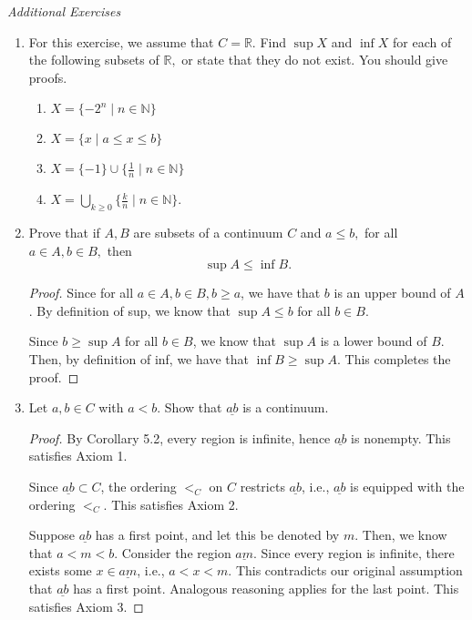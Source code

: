 \documentclass[11pt]{article}
\newcommand{\bbN}{\mathbb{N}}
\newcommand{\bbR}{\mathbb{R}}
\renewcommand{\_}[1]{\underline{ #1 }}
\theoremstyle{definition}
\numberwithin{equation}{subsection}
\begin{document}
\begin{center}
{\em Additional Exercises}
\end{center}

\begin{enumerate}
\item
For this exercise, we assume that $C=\bbR.$ Find $\sup X$ and $\inf X$ for each of the following subsets
of $\bbR,$ or state that they do not exist. You should give proofs.
\begin{enumerate}
\item $X=\{-2^n\mid n\in \bbN\}$
\item $X=\{ x\mid  a\leq x\leq b\}$
\item $X=\{-1\}\cup\{\frac{1}{n}\mid n\in\bbN\}$
\item $X=\bigcup_{k\geq 0}\{\frac{k}{n}\mid n\in\bbN\}.$
\end{enumerate}


\item Prove that if $A,B$ are subsets of a continuum $C$ and $a\leq b,$ for all $a\in A,b\in B,$ then
$$\sup A \leq \inf B.$$

\begin{proof}
Since for all $a\in A,b\in B, b\geq a$, we have that $b$ is an upper bound of $A$. By definition of sup, we know that $\sup A \leq b$ for all $b \in B$.

Since $b \geq \sup A$ for all $b \in B$, we know that $\sup A$ is a lower bound of $B$. Then, by definition of inf, we have that $\inf B \geq \sup A$. This completes the proof.


\renewcommand\qedsymbol{QED}
\end{proof}




\item
	Let $a,b \in C$ with $a < b$.  Show that $\underline{ab}$ is a continuum.
\begin{proof}
By Corollary 5.2, every region is infinite, hence $\_{ab}$ is nonempty. This satisfies Axiom 1.

Since $\_{ab} \subset C$, the ordering $<_C$ on $C$ restricts $\_{ab}$, i.e., $\_{ab}$ is equipped with the ordering $<_C$. This satisfies Axiom 2.

Suppose $\_{ab}$ has a first point, and let this be denoted by $m$. Then, we know that $a<m<b$. Consider the region $\_{am}$. Since every region is infinite, there exists some $x \in \_{am}$, i.e., $a<x<m$. This contradicts our original assumption that $\_{ab}$ has a first point. Analogous reasoning applies for the last point. This satisfies Axiom 3.


\end{proof}
\end{enumerate}
\end{document}
